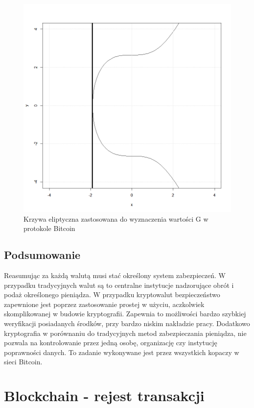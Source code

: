 \documentclass[12pt, twoside, final, openany]{mgr}
\begin{document}
\newpage
\vfill
\begin{figure}[!h]
\centering
\includegraphics[width=0.9\linewidth]{pictures/elliptic.png}
\caption{Krzywa eliptyczna zastosowana do wyznaczenia wartości G w protokole Bitcoin}
\label{fig:krzywaEliptyczna}
\end{figure}

\section{Podsumowanie} \label{sec:podsumowanieKryptowaluty}
\indent Reasumując za każdą walutą musi stać określony system zabezpieczeń. W przypadku tradycyjnych walut są to centralne instytucje nadzorujące obrót i podaż określonego pieniądza. W przypadku kryptowalut bezpieczeństwo zapewnione jest poprzez zastosowanie prostej w użyciu, aczkolwiek skomplikowanej w budowie kryptografii. Zapewnia to możliwości bardzo szybkiej weryfikacji posiadanych środków, przy bardzo niskim nakładzie pracy. Dodatkowo kryptografia w porównaniu do tradycyjnych metod zabezpieczania pieniądza, nie pozwala na kontrolowanie przez jedną osobę, organizację czy instytucję poprawności danych. To zadanie wykonywane jest przez wszystkich kopaczy w sieci Bitcoin. 


\chapter{Blockchain - rejest transakcji}
\label{blockchain}
\end{document}
